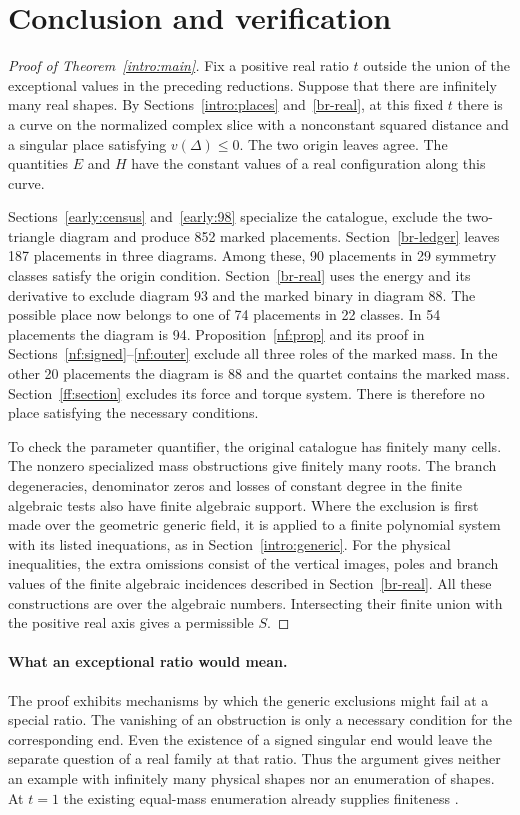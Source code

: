 \documentclass[11pt,letterpaper]{article}
\theoremstyle{definition}
\begin{document}
\section{Conclusion and verification}\label{end:proof}
\begin{proof}[Proof of Theorem~\ref{intro:main}]
Fix a positive real ratio $t$ outside the union of the exceptional values in the preceding reductions. Suppose that there are infinitely many real shapes. By Sections~\ref{intro:places} and~\ref{br-real}, at this fixed $t$ there is a curve on the normalized complex slice with a nonconstant squared distance and a singular place satisfying $v(\Delta)\le0$. The two origin leaves agree. The quantities $E$ and $H$ have the constant values of a real configuration along this curve.

Sections~\ref{early:census} and~\ref{early:98} specialize the catalogue, exclude the two-triangle diagram and produce 852 marked placements. Section~\ref{br-ledger} leaves 187 placements in three diagrams. Among these, 90 placements in 29 symmetry classes satisfy the origin condition. Section~\ref{br-real} uses the energy and its derivative to exclude diagram 93 and the marked binary in diagram 88. The possible place now belongs to one of 74 placements in 22 classes. In 54 placements the diagram is 94. Proposition~\ref{nf:prop} and its proof in Sections~\ref{nf:signed}--\ref{nf:outer} exclude all three roles of the marked mass. In the other 20 placements the diagram is 88 and the quartet contains the marked mass. Section~\ref{ff:section} excludes its force and torque system. There is therefore no place satisfying the necessary conditions.

To check the parameter quantifier, the original catalogue has finitely many cells. The nonzero specialized mass obstructions give finitely many roots. The branch degeneracies, denominator zeros and losses of constant degree in the finite algebraic tests also have finite algebraic support. Where the exclusion is first made over the geometric generic field, it is applied to a finite polynomial system with its listed inequations, as in Section~\ref{intro:generic}. For the physical inequalities, the extra omissions consist of the vertical images, poles and branch values of the finite algebraic incidences described in Section~\ref{br-real}. All these constructions are over the algebraic numbers. Intersecting their finite union with the positive real axis gives a permissible $S$.
\end{proof}

\paragraph{What an exceptional ratio would mean.}
The proof exhibits mechanisms by which the generic exclusions might fail at a special ratio. The vanishing of an obstruction is only a necessary condition for the corresponding end. Even the existence of a signed singular end would leave the separate question of a real family at that ratio. Thus the argument gives neither an example with infinitely many physical shapes nor an enumeration of shapes. At $t=1$ the existing equal-mass enumeration already supplies finiteness \cite{MZplanar}.
\end{document}
